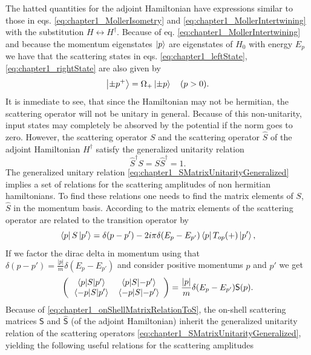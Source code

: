 %
The hatted quantities for the adjoint Hamiltonian have expressions similar to those in eqs. \eqref{eq:chapter1_MollerIsometry} and \eqref{eq:chapter1_MollerIntertwining} with the substitution $H\leftrightarrow H^\dagger$. Because of eq. \eqref{eq:chapter1_MollerIntertwining} and because the momentum eigenstates $\ket{p}$ are eigenstates of $H_0$ with energy $E_p$ we have that the scattering states in eqs. \eqref{eq:chapter1_leftState}, \eqref{eq:chapter1_rightState} are also given by
%
\begin{equation}
  \ket{\pm p^+} = \Omega_+ \ket{\pm p}\quad (p>0).
  \label{eq:chapter1_scatteringStateFromMoller}
\end{equation}
%
%
It is inmediate to see, that since the Hamiltonian may not be hermitian, the scattering operator will not be unitary in general. Because of this non-unitarity, input states may completely be absorved by the potential if the norm goes to zero. However, the scattering operator $S$ and the scattering operator $\widehat{S}$ of the adjoint Hamiltonian $H^\dagger$ satisfy the generalized unitarity relation
%
\begin{equation}
  \widehat{S}^\dagger S = S\widehat{S}^\dagger= 1.
  \label{eq:chapter1_SMatrixUnitarityGeneralized}
\end{equation}
%
The generalized unitary relation \eqref{eq:chapter1_SMatrixUnitarityGeneralized} implies a set of relations for the scattering amplitudes of non hermitian hamiltonians. To find these relations one needs to find the matrix elements of $S$, $\widehat{S}$ in the momentum basis. According to \cite{Muga2004} the matrix elements of the scattering operator are related to the transition operator by
%
\begin{equation}
    \bra{p} S \ket{p'} = \delta (p-p') -2 i \pi \delta (E_p-E_{p'}) \bra{p}T_{op}(+)\ket{p'},
    \label{eq:SmatrixElements}
\end{equation}
%
If we factor the dirac delta in momentum using that $\delta(p-p') = \frac{|p|}{m}\delta(E_{p}-E_{p'})$ and consider positive momentums $p$ and $p'$ we get
%
\begin{equation}
  \left(
  \begin{array}{cc}
    \mel{p}{S}{p'} & \mel{p}{S}{-p'}\\
    \mel{-p}{S}{p'} & \mel{-p}{S}{-p'}
  \end{array}
  \right)
  = \frac{|p|}{m}\delta(E_{p}-E_{p'})\mathsf{S}(p).
  \label{eq:chapter1_onShellMatrixRelationToS}
\end{equation}
%
Because of \eqref{eq:chapter1_onShellMatrixRelationToS}, the on-shell scattering matrices $\mathsf{S}$ and $\mathsf{\widehat{S}}$ (of the adjoint Hamiltonian) inherit the generalized unitarity relation of the scattering operators \eqref{eq:chapter1_SMatrixUnitarityGeneralized}, yielding the following useful relations for the scattering amplitudes
